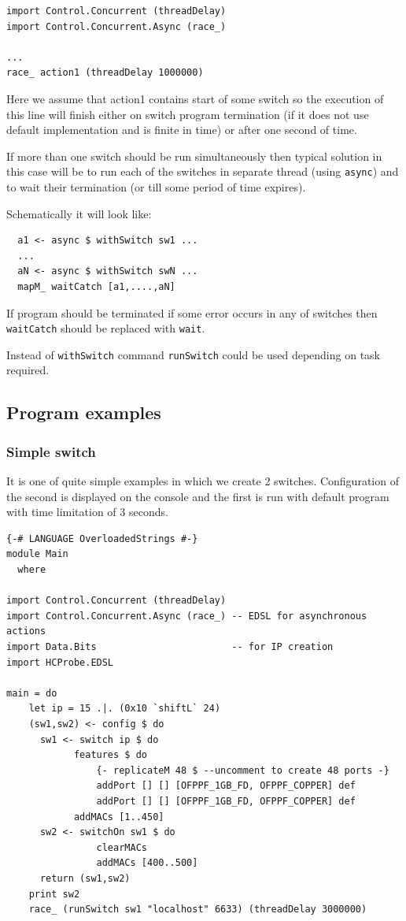 \documentclass[9pt,a4paper]{article}
\begin{document}
\begin{lstlisting}
import Control.Concurrent (threadDelay)
import Control.Concurrent.Async (race_)

...
race_ action1 (threadDelay 1000000)
\end{lstlisting}

Here we assume that action1 contains start of some switch so the
execution of this line will finish either on switch program
termination (if it does not use default implementation and is finite
in time) or after one second of time.

If more than one switch should be run simultaneously then typical
solution in this case will be to run each of the switches in separate
thread (using \lstinline!async!) and to wait their termination (or
till some period of time expires).

Schematically it will look like:

\begin{lstlisting}
  a1 <- async $ withSwitch sw1 ...
  ...
  aN <- async $ withSwitch swN ...
  mapM_ waitCatch [a1,....,aN]
\end{lstlisting}

If program should be terminated if some error occurs in any of
switches then \lstinline!waitCatch! should be replaced with
\lstinline!wait!.

Instead of \lstinline!withSwitch! command \lstinline!runSwitch! could
be used depending on task required.

\subsection{Program examples}

\subsubsection{Simple switch}

It is one of quite simple examples in which we create 2
switches. Configuration of the second is displayed on the console and
the first is run with default program with time limitation of 3 seconds.

\begin{lstlisting}
{-# LANGUAGE OverloadedStrings #-}
module Main
  where

import Control.Concurrent (threadDelay)
import Control.Concurrent.Async (race_) -- EDSL for asynchronous actions
import Data.Bits                        -- for IP creation
import HCProbe.EDSL

main = do 
    let ip = 15 .|. (0x10 `shiftL` 24)
    (sw1,sw2) <- config $ do
      sw1 <- switch ip $ do
            features $ do
                {- replicateM 48 $ --uncomment to create 48 ports -}
                addPort [] [] [OFPPF_1GB_FD, OFPPF_COPPER] def
                addPort [] [] [OFPPF_1GB_FD, OFPPF_COPPER] def
            addMACs [1..450]
      sw2 <- switchOn sw1 $ do
                clearMACs 
                addMACs [400..500]
      return (sw1,sw2)
    print sw2
    race_ (runSwitch sw1 "localhost" 6633) (threadDelay 3000000)
\end{lstlisting}
\end{document}
